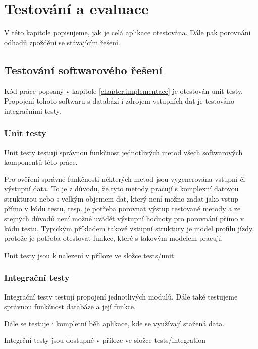 

\chapter{Testování a evaluace}


V této kapitole popisujeme, jak je celá aplikace otestována. Dále pak porovnání odhadů zpoždění se stávajícím řešení.


\section{Testování softwarového řešení}


Kód práce popsaný v kapitole \ref{chapter:implementace} je otestován unit testy. Propojení tohoto softwaru s databází i zdrojem vstupních dat je testováno integračními testy.


\subsection{Unit testy}


Unit testy testují správnou funkčnost jednotlivých metod všech softwarových komponentů této práce.


Pro ověření správné funkčnosti některých metod jsou vygenerována vstupní či výstupní data. To je z důvodu, že tyto metody pracují s komplexní datovou strukturou nebo s velkým objemem dat, který není možno zadat jako vstup přímo v kódu testu, resp. je potřeba porovnat výstup testované metody a ze stejných důvodů není možné uvádět výstupní hodnoty pro porovnání přímo v kódu testu. Typickým příkladem takové vstupní struktury je model profilu jízdy, protože je potřeba otestovat funkce, které s takovým modelem pracují.

Unit testy jsou k nalezení v příloze ve složce tests/unit.


\subsection{Integrační testy}

Integrační testy testují propojení jednotlivých modulů. Dále také testujeme správnou funkčnost databáze a její funkce.

\bigbreak

Dále se testuje i kompletní běh aplikace, kde se využívají stažená data.

\bigbreak

Integrční testy jsou dostupné v příloze ve složce tests/integration


